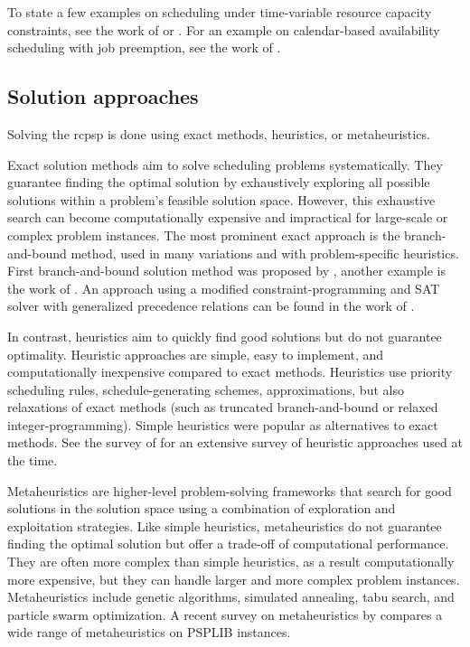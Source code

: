 To state a few examples on scheduling under time-variable resource capacity constraints,
see the work of \citet{Klein2000} or \citet{Nonobe2002}.
For an example on calendar-based availability scheduling with job preemption, see the work of \citet{Franck2001}.

\subsection{Solution approaches} \label{subsec:related-works/scheduling-the-rcpsp/solution-approaches}

Solving the \ac{rcpsp} is done using exact methods, heuristics, or metaheuristics.

Exact solution methods aim to solve scheduling problems systematically.
They guarantee finding the optimal solution by exhaustively exploring all possible solutions
within a problem's feasible solution space.
However, this exhaustive search can become computationally expensive
and impractical for large-scale or complex problem instances.
The most prominent exact approach is the branch-and-bound method,
used in many variations and with problem-specific heuristics.
First branch-and-bound solution method was proposed by \citet{Demeulemeester1992},
another example is the work of \citet{Vanhoucke2001}.
An approach using a modified constraint-programming and SAT solver
with generalized precedence relations can be found in the work of \citet{Schnell2015}.

In contrast, heuristics aim to quickly find good solutions but do not guarantee optimality.
Heuristic approaches are simple, easy to implement, and computationally inexpensive compared to exact methods.
Heuristics use priority scheduling rules, schedule-generating schemes, approximations,
but also relaxations of exact methods (such as truncated branch-and-bound or relaxed integer-programming).
Simple heuristics were popular as alternatives to exact methods.
See the survey of \citet{Kolisch1999} for an extensive survey of heuristic approaches used at the time.

Metaheuristics are higher-level problem-solving frameworks that search for good solutions
in the solution space using a combination of exploration and exploitation strategies.
Like simple heuristics, metaheuristics do not guarantee finding the optimal solution
but offer a trade-off of computational performance.
They are often more complex than simple heuristics, as a result computationally more expensive,
but they can handle larger and more complex problem instances.
Metaheuristics include genetic algorithms, simulated annealing, tabu search, and particle swarm optimization.
A recent survey on metaheuristics by \citet{Pellerin2020} compares a wide range of metaheuristics
on PSPLIB instances.

